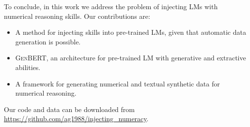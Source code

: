 \documentclass[11pt,a4paper]{article}
\newcommand\genbert{\textsc{GenBERT}}
\begin{document}
To conclude, in this work we address the problem of injecting LMs with numerical reasoning skills. Our contributions are:
\begin{itemize}[leftmargin=*,topsep=0pt,itemsep=0pt,parsep=0pt]
    \item A method for injecting skills into pre-trained LMs, given that automatic data generation is possible.
    \item \genbert{}, an architecture for pre-trained LM with generative and extractive abilities.
    \item A framework for generating numerical and textual synthetic data for numerical reasoning.

\end{itemize}



Our code and data can be downloaded from \url{https://github.com/ag1988/injecting\_numeracy}.
\end{document}
